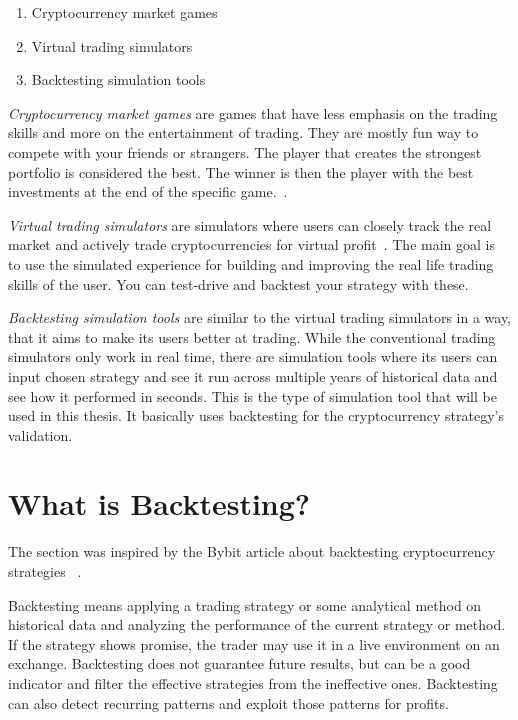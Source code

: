 \begin{enumerate}
    \item Cryptocurrency market games
    \item Virtual trading simulators
    \item Backtesting simulation tools
\end{enumerate}

\emph{Cryptocurrency market games} are games that have less emphasis on the trading skills and more on the entertainment of trading. They are mostly fun way to compete with your friends or strangers. The player that creates the strongest portfolio is considered the best. The winner is then the player with the best investments at the end of the specific game.~\cite{top-stocks-crypto-trading-simulators}.

\emph{Virtual trading simulators} are simulators where users can closely track the real market and actively trade cryptocurrencies for virtual profit~\cite{top-stocks-crypto-trading-simulators}. The main goal is to use the simulated experience for building and improving the real life trading skills of the user. You can test-drive and backtest your strategy with these.

\emph{Backtesting simulation tools} are similar to the virtual trading simulators in a way, that it aims to make its users better at trading. While the conventional trading simulators only work in real time, there are simulation tools where its users can input chosen strategy and see it run across multiple years of historical data and see how it performed in seconds. This is the type of simulation tool that will be used in this thesis. It basically uses backtesting for the cryptocurrency strategy's validation.

\section{What is Backtesting?}
The section was inspired by the Bybit article about backtesting cryptocurrency strategies ~\cite{backtesting-crypto-trading-strategies}.

Backtesting means applying a trading strategy or some analytical method on historical data and analyzing the performance of the current strategy or method. If the strategy shows promise, the trader may use it in a live environment on an exchange. Backtesting does not guarantee future results, but can be a good indicator and filter the effective strategies from the ineffective ones. Backtesting can also detect recurring patterns and exploit those patterns for profits.

